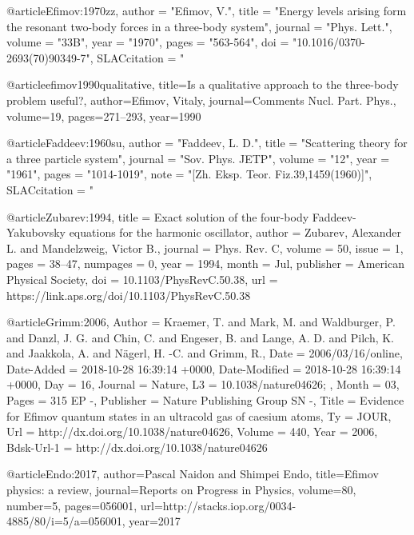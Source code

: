 
@article{Efimov:1970zz,
      author         = "Efimov, V.",
      title          = "{Energy levels arising form the resonant two-body forces
                        in a three-body system}",
      journal        = "Phys. Lett.",
      volume         = "33B",
      year           = "1970",
      pages          = "563-564",
      doi            = "10.1016/0370-2693(70)90349-7",
      SLACcitation   = "%
}

@article{efimov1990qualitative,
	title={Is a qualitative approach to the three-body problem useful?},
	author={Efimov, Vitaly},
	journal={Comments Nucl. Part. Phys.},
	volume={19},
	pages={271--293},
	year={1990}
}

@article{Faddeev:1960su,
	author         = "Faddeev, L. D.",
	title          = "{Scattering theory for a three particle system}",
	journal        = "Sov. Phys. JETP",
	volume         = "12",
	year           = "1961",
	pages          = "1014-1019",
	note           = "[Zh. Eksp. Teor. Fiz.39,1459(1960)]",
	SLACcitation   = "%
}

@article{Zubarev:1994,
	title = {Exact solution of the four-body Faddeev-Yakubovsky equations for the harmonic oscillator},
	author = {Zubarev, Alexander L. and Mandelzweig, Victor B.},
	journal = {Phys. Rev. C},
	volume = {50},
	issue = {1},
	pages = {38--47},
	numpages = {0},
	year = {1994},
	month = {Jul},
	publisher = {American Physical Society},
	doi = {10.1103/PhysRevC.50.38},
	url = {https://link.aps.org/doi/10.1103/PhysRevC.50.38}
}


@article{Grimm:2006,
	Author = {Kraemer, T. and Mark, M. and Waldburger, P. and Danzl, J. G. and Chin, C. and Engeser, B. and Lange, A. D. and Pilch, K. and Jaakkola, A. and N{\"a}gerl, H. -C. and Grimm, R.},
	Date = {2006/03/16/online},
	Date-Added = {2018-10-28 16:39:14 +0000},
	Date-Modified = {2018-10-28 16:39:14 +0000},
	Day = {16},
	Journal = {Nature},
	L3 = {10.1038/nature04626; },
	Month = {03},
	Pages = {315 EP  -},
	Publisher = {Nature Publishing Group SN  -},
	Title = {Evidence for Efimov quantum states in an ultracold gas of caesium atoms},
	Ty = {JOUR},
	Url = {http://dx.doi.org/10.1038/nature04626},
	Volume = {440},
	Year = {2006},
	Bdsk-Url-1 = {http://dx.doi.org/10.1038/nature04626}
}

@article{Endo:2017,
	author={Pascal Naidon and Shimpei Endo},
	title={Efimov physics: a review},
	journal={Reports on Progress in Physics},
	volume={80},
	number={5},
	pages={056001},
	url={http://stacks.iop.org/0034-4885/80/i=5/a=056001},
	year={2017}
	}


